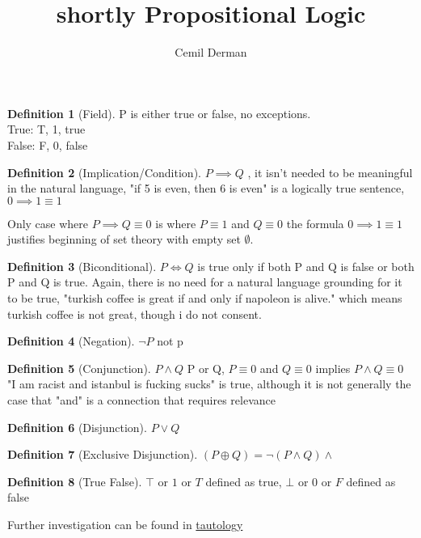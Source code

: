 \documentclass{article}
\title{shortly Propositional Logic}
\author{Cemil Derman}
\theoremstyle{definition}
\newtheorem{definition}{Definition}[section]
\begin{document}
    \maketitle
    \begin{definition}[Field]
        P is either true or false, no exceptions. \\
        True: T, 1, true \\ 
        False: F, 0, false
        
    \end{definition}
    \begin{definition}[Implication/Condition]
    $P \implies Q$  , it isn't needed to be meaningful in the natural language, "if 5 is even, then 6 is even" is a logically true sentence, $0 \implies 1 \equiv 1$
  
    Only case where $P \implies Q \equiv 0$ is where $P \equiv 1$ and $Q \equiv 0$
    the formula $0 \implies 1 \equiv 1$ justifies beginning of set theory with empty set $\emptyset$. %
    \end{definition}
    \begin{definition}[Biconditional]
      $P \iff{Q}$ is true only if both P and Q is false or both P and Q is true. Again, there is no need for a natural language grounding for it to be true,
     "turkish coffee is great if and only if napoleon is alive." which means turkish coffee is not great, though i do not consent.
    \end{definition}
    
    \begin{definition}[Negation]
      $\neg P$ not p 
    \end{definition}

    \begin{definition}[Conjunction]
   $P \wedge Q$ P or Q, $P \equiv 0$ and $Q \equiv 0$ implies $P \wedge Q \equiv 0$ 
      "I am racist and istanbul is fucking sucks" is true, although it is not generally the case that "and" is a connection that requires relevance      
    \end{definition}


    \begin{definition}[Disjunction]
      $P \lor Q$
      
    \end{definition}

    \begin{definition}[Exclusive Disjunction]
      $(P \oplus Q) = \neg(P \wedge Q) \wedge $ %

    \end{definition}

    \begin{definition}[True False]
      $\top$ or $1$ or $T$ defined as true, 
      $\bot$ or $0$ or $F$ defined as false
      
    \end{definition}

    Further investigation can be found in \href{../../tautology/propositional.pdf}{tautology}
\end{document}
